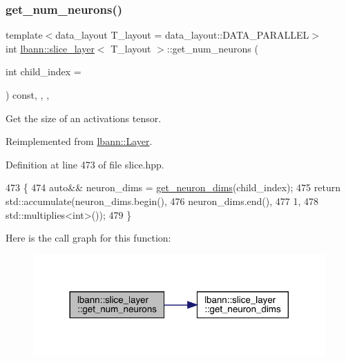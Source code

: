 \subsubsection{\texorpdfstring{get\+\_\+num\+\_\+neurons()}{get\_num\_neurons()}}
{\footnotesize\ttfamily template$<$data\+\_\+layout T\+\_\+layout = data\+\_\+layout\+::\+D\+A\+T\+A\+\_\+\+P\+A\+R\+A\+L\+L\+EL$>$ \\
int \hyperlink{classlbann_1_1slice__layer}{lbann\+::slice\+\_\+layer}$<$ T\+\_\+layout $>$\+::get\+\_\+num\+\_\+neurons (\begin{DoxyParamCaption}\item[{int}]{child\+\_\+index = {} }\end{DoxyParamCaption}) const\hspace{0.3cm}{\ttfamily [inline]}, {\ttfamily [override]}, {\ttfamily [protected]}, {\ttfamily [virtual]}}

Get the size of an activations tensor. 

Reimplemented from \hyperlink{classlbann_1_1Layer_aa4de686cc6c2dd38166f42faf874f227}{lbann\+::\+Layer}.



Definition at line 473 of file slice.\+hpp.


\begin{DoxyCode}
473                                                           \{
474     \textcolor{keyword}{auto}&& neuron\_dims = \hyperlink{classlbann_1_1slice__layer_a824178abe2450bd331304ab0d50214ce}{get\_neuron\_dims}(child\_index);
475     \textcolor{keywordflow}{return} std::accumulate(neuron\_dims.begin(),
476                            neuron\_dims.end(),
477                            1,
478                            std::multiplies<int>());
479   \}
\end{DoxyCode}
Here is the call graph for this function\+:\nopagebreak
\begin{figure}[H]
\begin{center}
\leavevmode
\includegraphics[width=317pt]{classlbann_1_1slice__layer_ab36016849a59dfa23d37fd0cd2ec943c_cgraph}
\end{center}
\end{figure}
\mbox{\label{classlbann_1_1slice__layer_a5c02b2a15355be051f93e72f3b2803ce}} 
